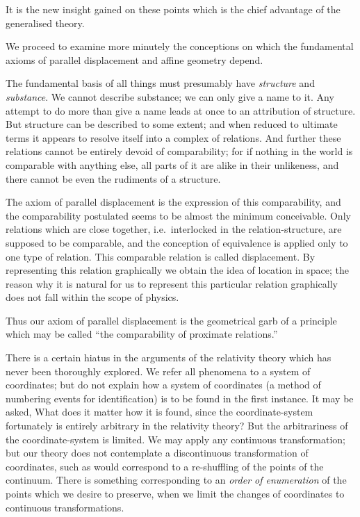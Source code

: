 \documentclass[12pt]{book}
\begin{document}
It is the new insight gained on these points which is the chief advantage
of the generalised theory.

%
%

We proceed to examine more minutely the conceptions on which the
fundamental axioms of parallel displacement and affine geometry depend.

The fundamental basis of all things must presumably have \emph{structure} and
\emph{substance}. We cannot describe substance; we can only give a name to it.
Any attempt to do more than give a name leads at once to an attribution of
structure. But structure can be described to some extent; and when reduced
to ultimate terms it appears to resolve itself into a complex of relations. And
further these relations cannot be entirely devoid of comparability; for if
nothing in the world is comparable with anything else, all parts of it are alike
in their unlikeness, and there cannot be even the rudiments of a structure.

The axiom of parallel displacement is the expression of this comparability,
and the comparability postulated seems to be almost the minimum conceivable.
Only relations which are close together, i.e.\ interlocked in the relation-structure,
are supposed to be comparable, and the conception of equivalence
is applied only to one type of relation. This comparable relation is called
displacement. By representing this relation graphically we obtain the idea of
location in space; the reason why it is natural for us to represent this particular
relation graphically does not fall within the scope of physics.

Thus our axiom of parallel displacement is the geometrical garb of a
principle which may be called ``the comparability of proximate relations.''
%

There is a certain hiatus in the arguments of the relativity theory which
has never been thoroughly explored. We refer all phenomena to a system of
coordinates; but do not explain how a system of coordinates (a method of
%
numbering events for identification) is to be found in the first instance. It
may be asked, What does it matter how it is found, since the coordinate-system
fortunately is entirely arbitrary in the relativity theory? But the
arbitrariness of the coordinate-system is limited. We may apply any continuous
transformation; but our theory does not contemplate a discontinuous
transformation of coordinates, such as would correspond to a re-shuffling of
%
the points of the continuum. There is something corresponding to an \emph{order of
enumeration} of the points which we desire to preserve, when we limit the
changes of coordinates to continuous transformations.
\end{document}
